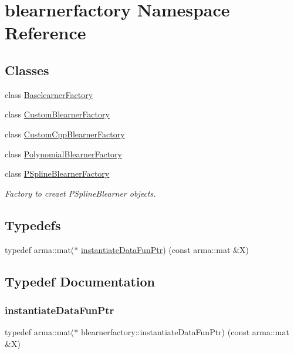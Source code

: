 \hypertarget{namespaceblearnerfactory}{}\section{blearnerfactory Namespace Reference}
\label{namespaceblearnerfactory}
\subsection*{Classes}
\begin{DoxyCompactItemize}
\item 
class \hyperlink{classblearnerfactory_1_1_baselearner_factory}{Baselearner\+Factory}
\item 
class \hyperlink{classblearnerfactory_1_1_custom_blearner_factory}{Custom\+Blearner\+Factory}
\item 
class \hyperlink{classblearnerfactory_1_1_custom_cpp_blearner_factory}{Custom\+Cpp\+Blearner\+Factory}
\item 
class \hyperlink{classblearnerfactory_1_1_polynomial_blearner_factory}{Polynomial\+Blearner\+Factory}
\item 
class \hyperlink{classblearnerfactory_1_1_p_spline_blearner_factory}{P\+Spline\+Blearner\+Factory}
\begin{DoxyCompactList}\small\item\em Factory to creaet {\ttfamily P\+Spline\+Blearner} objects. \end{DoxyCompactList}\end{DoxyCompactItemize}
\subsection*{Typedefs}
\begin{DoxyCompactItemize}
\item 
typedef arma\+::mat($\ast$ \hyperlink{namespaceblearnerfactory_a74e80c9723f4fa8866e09a04dfa3035b}{instantiate\+Data\+Fun\+Ptr}) (const arma\+::mat \&X)
\end{DoxyCompactItemize}


\subsection{Typedef Documentation}
\mbox{\label{namespaceblearnerfactory_a74e80c9723f4fa8866e09a04dfa3035b}} 
\subsubsection{\texorpdfstring{instantiate\+Data\+Fun\+Ptr}{instantiateDataFunPtr}}
{\footnotesize\ttfamily typedef arma\+::mat($\ast$ blearnerfactory\+::instantiate\+Data\+Fun\+Ptr) (const arma\+::mat \&X)}

